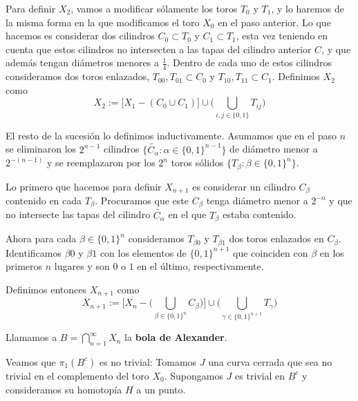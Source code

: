 Para definir $X_2$, vamos a modificar sólamente los toros $T_0$ y $T_1$, y lo haremos de la misma forma en la que modificamos el toro $X_0$ en el paso anterior. Lo que hacemos es considerar dos cilindros $C_0\subset T_0$ y $C_1\subset T_1$, esta vez teniendo en cuenta que estos cilindros no intersecten a las tapas del cilindro anterior $C$, y que además tengan diámetros menores a $\frac{1}{4}$. Dentro de cada uno de estos cilindros consideramos dos toros enlazados, $T_{00}, T_{01}\subset C_0$ y $T_{10}, T_{11}\subset C_1$. Definimos $X_2$ como $$X_2:=\big[X_1-(C_0\cup C_1)\big]\cup\bigg(\bigcup\limits_{i,j\in\{0,1\}} T_{ij}\bigg)$$

El resto de la sucesión lo definimos inductivamente. Asumamos que en el paso $n$ se eliminaron los $2^{n-1}$ cilindros $\{\tilde{C_\alpha} : \alpha\in \{0,1\}^{n-1}\}$ de diámetro menor a $2^{-(n-1)}$ y se reemplazaron por los $2^n$ toros sólidos $\{T_\beta : \beta\in \{0,1\}^{n}\}$. 

Lo primero que hacemos para definir $X_{n+1}$ es considerar un cilindro $C_\beta$ contenido en cada $T_\beta$. Procuramos que este $C_\beta$ tenga diámetro menor a $2^{-n}$ y que no intersecte las tapas del cilindro $\tilde{C_\alpha}$ en el que $T_\beta$ estaba contenido.

Ahora para cada $\beta\in\{0,1\}^n$ consideramos $T_{\beta 0}$ y $T_{\beta 1}$ dos toros enlazados en $C_\beta$. Identificamos $\beta 0$ y $\beta 1$ con los elementos de $\{0,1\}^{n+1}$ que coinciden con $\beta$ en los primeros $n$ lugares y son $0$ o $1$ en el último, respectivamente.

Definimos entonces $X_{n+1}$ como $$X_{n+1}:=\bigg[X_n-\bigg(\bigcup\limits_{\beta\in\{0,1\}^n} C_\beta \bigg)\bigg]\cup\bigg( \bigcup\limits_{\gamma\in\{0,1\}^{n+1}}T_\gamma\bigg)$$

Llamamos a $B=\bigcap\limits_{n=1}^\infty X_n$ la \textbf{bola de Alexander}.



Veamos que $\pi_1(B^c)$ es no trivial: Tomamos $J$ una curva cerrada que sea no trivial en el complemento del toro $X_0$. Supongamos $J$ es trivial en $B^c$ y consideramos su homotopía $H$ a un punto. 
            
